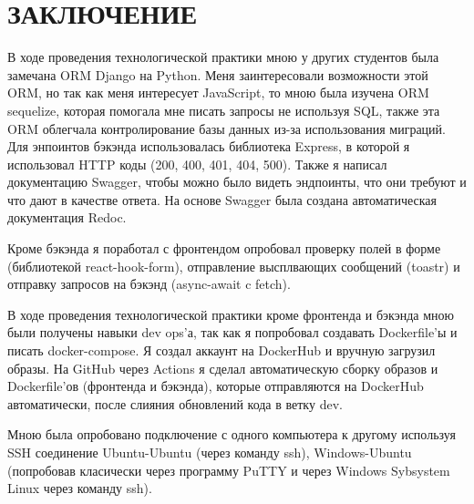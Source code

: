 \newpage
{}
\section*{ЗАКЛЮЧЕНИЕ}

В ходе проведения технологической практики мною у других студентов была замечана ORM Django на Python.
Меня заинтересовали возможности этой ORM, но так как меня интересует JavaScript,
то мною была изучена ORM sequelize,
которая помогала мне писать запросы не используя SQL,
также эта ORM облегчала контролирование базы данных из-за использования миграций.
Для энпоинтов бэкэнда использовалась библиотека Express, в которой я использовал HTTP коды (200, 400, 401, 404, 500).
Также я написал документацию Swagger, чтобы можно было видеть эндпоинты, что они требуют и что дают в качестве ответа.
На основе Swagger была создана автоматическая документация Redoc.

Кроме бэкэнда я поработал с фронтендом опробовал проверку полей в форме (библиотекой react-hook-form),
отправление высплвающих сообщений (toastr) и отправку запросов на бэкэнд (async-await c fetch).

В ходе проведения технологической практики кроме фронтенда и бэкэнда мною были получены навыки dev ops'а,
так как я попробовал создавать Dockerfile'ы и писать docker-compose.
Я создал аккаунт на DockerHub и вручную загрузил образы.
На GitHub через Actions я сделал автоматическую сборку образов и Dockerfile'ов (фронтенда и бэкэнда),
которые отправляются на DockerHub автоматически, после слияния обновлений кода в ветку dev.

Мною была опробовано подключение с одного компьютера к другому используя SSH соединение Ubuntu-Ubuntu (через команду ssh),
Windows-Ubuntu (попробовав класически через программу PuTTY и через Windows Sybsystem Linux через команду ssh).
